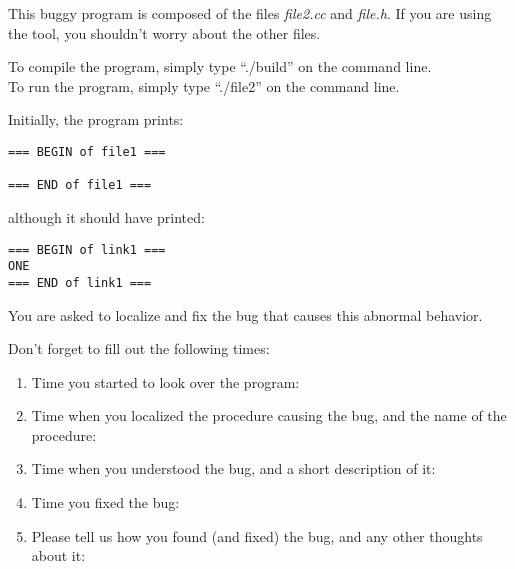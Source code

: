 \documentclass{article}
\title{}
\author{Debugging experiment - Bug 2}
\date{July 30, 2003}
\begin{document}
\maketitle
\begin{flushleft}
\vspace{0.5in}

\thispagestyle{empty}

This buggy program is composed of the files {\it file2.cc} and 
{\it file.h}. If you are using the tool, you shouldn't worry about the 
other files.

\vspace{0.1in}
To compile the program, simply type ``./build'' on the command line.\\
To run the program, simply type ``./file2'' on the command line.


\vspace{0.1in}
Initially, the program prints:

\begin{verbatim}
=== BEGIN of file1 ===

=== END of file1 ===
\end{verbatim}

although it should have printed:
\begin{verbatim}
=== BEGIN of link1 ===
ONE
=== END of link1 ===
\end{verbatim}


You are asked to localize and fix the bug that causes this abnormal behavior.


\vspace{0.3in}
Don't forget to fill out the following times:
\begin{enumerate}
\item{Time you started to look over the program:}
\item{Time when you localized the procedure causing the bug, and the name
      of the procedure:\vspace{0.2in}}
\item{Time when you understood the bug, and a short description of it:\vspace{0.4in}}

\item{Time you fixed the bug:}

\item{Please tell us how you found (and fixed) the bug, and any other thoughts 
about it:}

\end{enumerate}

\end{flushleft}
\end{document}
